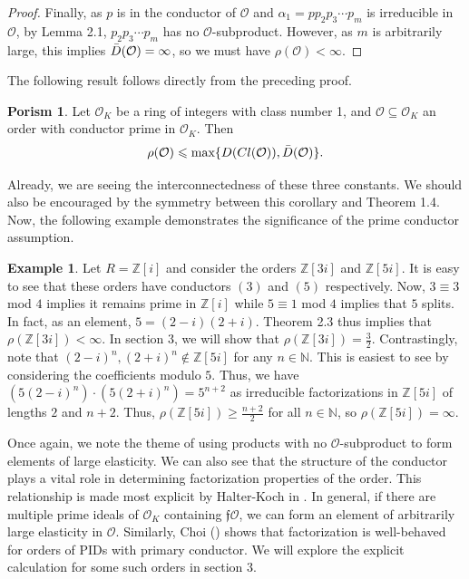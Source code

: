 \documentclass{amsart}
\theoremstyle{definition}
\newtheorem{por}[lem]{Porism}
\newtheorem{ex}[lem]{Example}
\newcommand{\MO}{\mathcal{O}}
\newcommand{\bbz}{\mathbb{Z}}
\newcommand{\bbn}{\mathbb{N}}
\renewcommand{\geq}{\geqslant}
\renewcommand{\leq}{\leqslant}
\numberwithin{equation}{section}
\begin{document}
\begin{proof}
    Finally, as $p$ is in the conductor of $\MO$ and $\alpha_1 = p p_2 p_3\dotsm p_m $ is irreducible in $\MO$, by Lemma 2.1, $p_2 p_3 \dotsm p_m$ has no $\mathcal{O}$-subproduct. However, as $m$ is arbitrarily large, this implies $\Bar{D}({\mathcal{O}}) = \infty$, so we must have $\rho(\mathcal{O}) <  \infty$.

\end{proof}

The following result follows directly from the preceding proof.

\begin{por}
    Let $\MO_K$ be a ring of integers with class number 1, and $\mathcal{O} \subseteq \MO_K$ an order with conductor prime in $\MO_K$. Then
    \[
    \rho(\MO) \leq \text{max}\{D(Cl(\MO)), \Bar{D}(\MO)\}.
    \]
\end{por}

 Already, we are seeing the interconnectedness of these three constants. We should also be encouraged by the symmetry between this corollary and Theorem 1.4. Now, the following example demonstrates the significance of the prime conductor assumption. 

\begin{ex}
    Let $R = \bbz[i]$ and consider the orders $\bbz[3i]$ and $\bbz[5i]$. It is easy to see that these orders have conductors $(3)$ and $(5)$ respectively. Now, $3 \equiv 3$ mod $4$ implies it remains prime in $\bbz[i]$ while $5 \equiv 1$ mod $4$ implies that $5$ splits. In fact, as an element, $5 = (2 - i)(2 + i)$. Theorem 2.3 thus implies that $\rho(\bbz[3i]) < \infty$. In section 3, we will show that $\rho(\bbz[3i]) = \frac{3}{2}$. Contrastingly, note that $(2-i)^n, (2+i)^n \notin \bbz[5i]$ for any $n \in \bbn$. This is easiest to see by considering the coefficients modulo $5$. Thus, we have $(5(2-i)^n)\cdot(5(2+i)^n) = 5^{n+2}$ as irreducible factorizations in $\bbz[5i]$ of lengths $2$ and $n + 2$. Thus, $\rho(\bbz[5i]) \geq \frac{n +2}{2}$ for all $n \in \bbn$, so $\rho(\bbz[5i]) = \infty$.
\end{ex}

Once again, we note the theme of using products with no $\MO$-subproduct to form elements of large elasticity. We can also see that the structure of the conductor plays a vital role in determining factorization properties of the order. This relationship is made most explicit by Halter-Koch in \cite{halter1995elasticity}. In general, if there are multiple prime ideals of $\MO_K$ containing $\mathfrak{f}\MO$, we can form an element of arbitrarily large elasticity in $\MO$.  Similarly, Choi (\cite{choi2024class}) shows that factorization is well-behaved for orders of PIDs with primary conductor. We will explore the explicit calculation for some such orders in section 3. 
\end{document}
